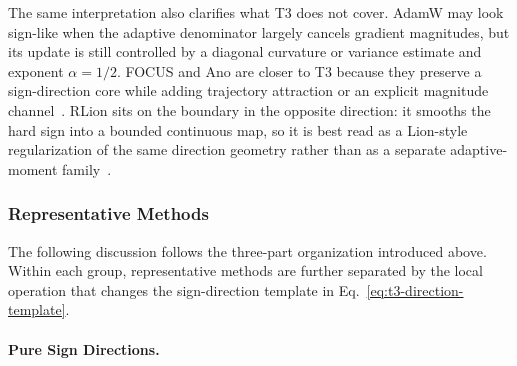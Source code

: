 The same interpretation also clarifies what T3 does not cover.  AdamW may
look sign-like when the adaptive denominator largely cancels gradient
magnitudes, but its update is still controlled by a diagonal curvature or
variance estimate and exponent $\alpha=1/2$.  FOCUS and Ano are closer to T3
because they preserve a sign-direction core while adding trajectory
attraction or an explicit magnitude channel~\citep{liu2025focus,kegreisz2025ano}.
RLion sits on the boundary in the opposite direction: it smooths the hard
sign into a bounded continuous map, so it is best read as a Lion-style
regularization of the same direction geometry rather than as a separate
adaptive-moment family~\citep{rong2024rlion}.

\subsubsection{Representative Methods}
\label{sec:t3-methods}

The following discussion follows the three-part organization introduced above.
Within each group, representative methods are further separated by the local
operation that changes the sign-direction template in
Eq.~\eqref{eq:t3-direction-template}.

\paragraph{Pure Sign Directions.}
\label{sec:t3-sign-predecessors}

